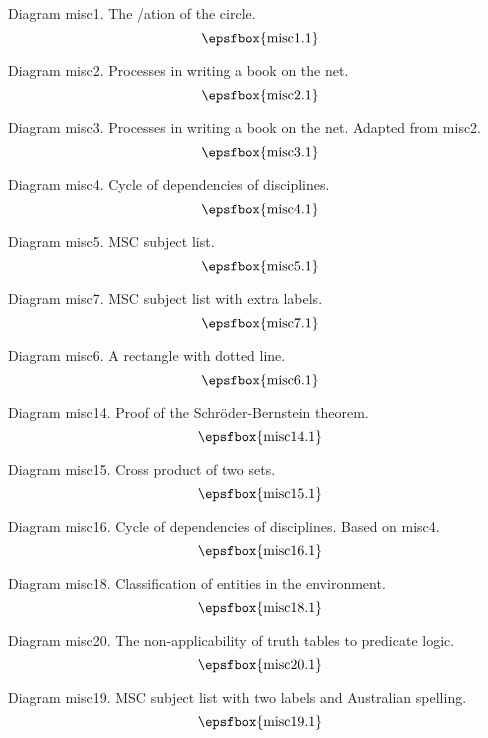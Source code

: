 \secteject
\edef\SECTmisc{\the\pageno}

Diagram misc1. The \parametris/ation of the circle.
$$
\centerline{\epsfbox{misc1.1}}
$$

Diagram misc2. Processes in writing a book on the net.
$$
\centerline{\epsfbox{misc2.1}}
$$

Diagram misc3. Processes in writing a book on the net. Adapted from misc2.
$$
\centerline{\epsfbox{misc3.1}}
$$

Diagram misc4. Cycle of dependencies of disciplines.
$$
\centerline{\epsfbox{misc4.1}}
$$

\filleject

Diagram misc5. MSC subject list.
$$
\centerline{\epsfbox{misc5.1}}
$$

\filleject

Diagram misc7. MSC subject list with extra labels.
$$
\centerline{\epsfbox{misc7.1}}
$$

\filleject

Diagram misc6. A rectangle with dotted line.
$$
\centerline{\epsfbox{misc6.1}}
$$

Diagram misc14. Proof of the Schr\"oder-Bernstein theorem.
$$
\centerline{\epsfbox{misc14.1}}
$$

Diagram misc15. Cross product of two sets.
$$
\centerline{\epsfbox{misc15.1}}
$$

\filleject

Diagram misc16. Cycle of dependencies of disciplines. Based on misc4.
$$
\centerline{\epsfbox{misc16.1}}
$$

Diagram misc18. Classification of entities in the environment.
$$
\centerline{\epsfbox{misc18.1}}
$$

Diagram misc20. The non-applicability of truth tables to predicate logic.
$$
\centerline{\epsfbox{misc20.1}}
$$

\filleject

Diagram misc19. MSC subject list with two labels and Australian
spelling.
$$
\centerline{\epsfbox{misc19.1}}
$$

